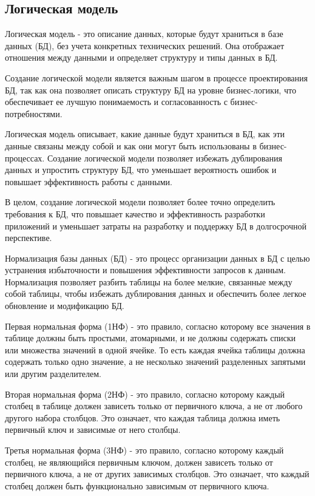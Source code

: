 \subsection*{Логическая модель}

Логическая модель - это описание данных, которые будут храниться в базе данных (БД), без учета конкретных технических решений.
Она отображает отношения между данными и определяет структуру и типы данных в БД.

Создание логической модели является важным шагом в процессе проектирования БД, так как она позволяет описать структуру БД на уровне бизнес-логики,
что обеспечивает ее лучшую понимаемость и согласованность с бизнес-потребностями.

Логическая модель описывает, какие данные будут храниться в БД, как эти данные связаны между собой и как они могут быть использованы в бизнес-процессах.
Создание логической модели позволяет избежать дублирования данных и упростить структуру БД, что уменьшает вероятность ошибок и повышает эффективность работы с данными.

В целом, создание логической модели позволяет более точно определить требования к БД,
что повышает качество и эффективность разработки приложений и уменьшает затраты на разработку и поддержку БД в долгосрочной перспективе.

Нормализация базы данных (БД) - это процесс организации данных в БД с целью устранения избыточности и повышения эффективности запросов к данным.
Нормализация позволяет разбить таблицы на более мелкие, связанные между собой таблицы,
чтобы избежать дублирования данных и обеспечить более легкое обновление и модификацию БД.

Первая нормальная форма (1НФ) - это правило, согласно которому все значения в таблице должны быть простыми, атомарными, и не должны содержать списки
или множества значений в одной ячейке.
То есть каждая ячейка таблицы должна содержать только одно значение, а не несколько значений разделенных запятыми или другим разделителем.

Вторая нормальная форма (2НФ) - это правило, согласно которому каждый столбец в таблице должен зависеть только от первичного ключа,
а не от любого другого набора столбцов. Это означает, что каждая таблица должна иметь первичный ключ и зависимые от него столбцы.

Третья нормальная форма (3НФ) - это правило, согласно которому каждый столбец, не являющийся первичным ключом,
должен зависеть только от первичного ключа,
а не от других зависимых столбцов.
Это означает, что каждый столбец должен быть функционально зависимым от первичного ключа.

